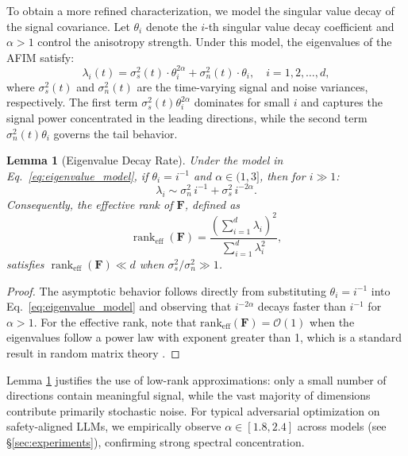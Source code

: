 ﻿\documentclass[lettersize,journal]{IEEEtran}
\newtheorem{lemma}{Lemma}
\begin{document}
To obtain a more refined characterization, we model the singular value decay of the signal covariance. Let $\theta_i$ denote the $i$-th singular value decay coefficient and $\alpha > 1$ control the anisotropy strength. Under this model, the eigenvalues of the AFIM satisfy:
\begin{equation}
\label{eq:eigenvalue_model}
\lambda_i(t) = \sigma_s^2(t) \cdot \theta_i^{2\alpha} + \sigma_n^2(t) \cdot \theta_i,
\quad i = 1, 2, \ldots, d,
\end{equation}
where $\sigma_s^2(t)$ and $\sigma_n^2(t)$ are the time-varying signal and noise variances, respectively. The first term $\sigma_s^2(t) \theta_i^{2\alpha}$ dominates for small $i$ and captures the signal power concentrated in the leading directions, while the second term $\sigma_n^2(t) \theta_i$ governs the tail behavior.

\begin{lemma}[Eigenvalue Decay Rate]
\label{lem:decay_rate}
Under the model in Eq.~\eqref{eq:eigenvalue_model}, if $\theta_i = i^{-1}$ and $\alpha \in (1, 3]$, then for $i \gg 1$:
\begin{equation}
\lambda_i \sim \sigma_n^2 \, i^{-1} + \sigma_s^2 \, i^{-2\alpha}.
\end{equation}
Consequently, the effective rank of $\mathbf{F}$, defined as
\begin{equation}
\label{eq:eff_rank}
\operatorname{rank}_{\text{eff}}(\mathbf{F}) = \frac{\left(\sum_{i=1}^{d} \lambda_i\right)^2}{\sum_{i=1}^{d} \lambda_i^2},
\end{equation}
satisfies $\operatorname{rank}_{\text{eff}}(\mathbf{F}) \ll d$ when $\sigma_s^2 / \sigma_n^2 \gg 1$.
\end{lemma}

\begin{proof}
The asymptotic behavior follows directly from substituting $\theta_i = i^{-1}$ into Eq.~\eqref{eq:eigenvalue_model} and observing that $i^{-2\alpha}$ decays faster than $i^{-1}$ for $\alpha > 1$. For the effective rank, note that $\text{rank}_{\text{eff}}(\mathbf{F}) = \mathcal{O}(1)$ when the eigenvalues follow a power law with exponent greater than 1, which is a standard result in random matrix theory \cite{vershynin2018high}.
\end{proof}

Lemma \ref{lem:decay_rate} justifies the use of low-rank approximations: only a small number of directions contain meaningful signal, while the vast majority of dimensions contribute primarily stochastic noise. For typical adversarial optimization on safety-aligned LLMs, we empirically observe $\alpha \in [1.8, 2.4]$ across models (see \S\ref{sec:experiments}), confirming strong spectral concentration.
\end{document}
